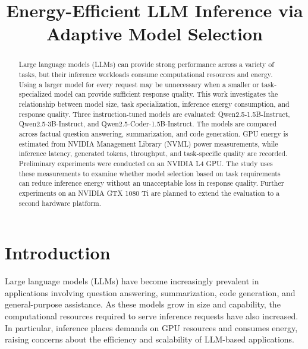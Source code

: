 \documentclass[conference]{IEEEtran}
\begin{document}
\title{Energy-Efficient LLM Inference via Adaptive Model Selection\\
}

\author{
\and
{}
}

\maketitle

\begin{abstract}
Large language models (LLMs) can provide strong performance across a
variety of tasks, but their inference workloads consume computational
resources and energy. Using a larger model for every request may be
unnecessary when a smaller or task-specialized model can provide
sufficient response quality. This work investigates the relationship
between model size, task specialization, inference energy consumption,
and response quality. Three instruction-tuned models are evaluated:
Qwen2.5-1.5B-Instruct, Qwen2.5-3B-Instruct, and
Qwen2.5-Coder-1.5B-Instruct. The models are compared across factual
question answering, summarization, and code generation. GPU energy is
estimated from NVIDIA Management Library (NVML) power measurements,
while inference latency, generated tokens, throughput, and
task-specific quality are recorded. Preliminary experiments were
conducted on an NVIDIA L4 GPU. The study uses these
measurements to examine whether model selection based on task
requirements can reduce inference energy without an unacceptable loss
in response quality. Further experiments on an NVIDIA GTX 1080 Ti are
planned to extend the evaluation to a second hardware platform.
\end{abstract}

\section{Introduction}
Large language models (LLMs) have become increasingly prevalent in
applications involving question answering, summarization, code
generation, and general-purpose assistance. As these models grow in
size and capability, the computational resources required to serve
inference requests have also increased. In particular, inference
places demands on GPU resources and consumes energy, raising concerns
about the efficiency and scalability of LLM-based applications.
\end{document}
